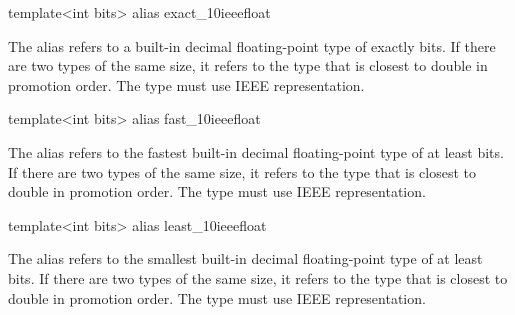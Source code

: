 \begin{addedblock}
\begin{itemdecl}
template<int bits> alias exact_10ieeefloat
\end{itemdecl}

\begin{itemdescr}
The alias  refers to a built-in decimal floating-point type of exactly  bits. If there are two types of the same size, it refers to the type that is closest to double in promotion order. The type must use IEEE representation.
\end{itemdescr}

\begin{itemdecl}
template<int bits> alias fast_10ieeefloat
\end{itemdecl}

\begin{itemdescr}
The alias  refers to the fastest built-in decimal floating-point type of at least  bits. If there are two types of the same size, it refers to the type that is closest to double in promotion order. The type must use IEEE representation.
\end{itemdescr}

\begin{itemdecl}
template<int bits> alias least_10ieeefloat
\end{itemdecl}

\begin{itemdescr}
The alias  refers to the smallest built-in decimal floating-point type of at least  bits. If there are two types of the same size, it refers to the type that is closest to double in promotion order. The type must use IEEE representation.
\end{itemdescr}   
\end{addedblock}
